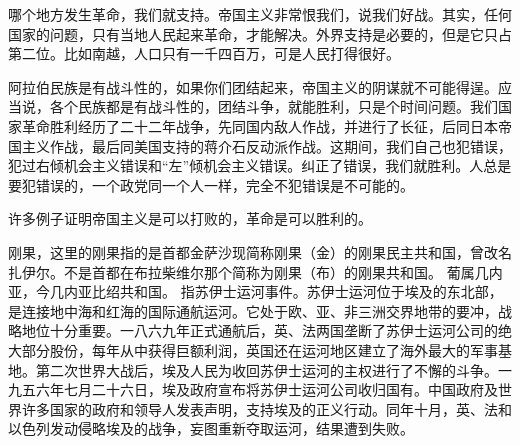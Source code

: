哪个地方发生革命，我们就支持。帝国主义非常恨我们，说我们好战。其实，任何国家的问题，只有当地人民起来革命，才能解决。外界支持是必要的，但是它只占第二位。比如南越，人口只有一千四百万，可是人民打得很好。

阿拉伯民族是有战斗性的，如果你们团结起来，帝国主义的阴谋就不可能得逞。应当说，各个民族都是有战斗性的，团结斗争，就能胜利，只是个时间问题。我们国家革命胜利经历了二十二年战争，先同国内敌人作战，并进行了长征，后同日本帝国主义作战，最后同美国支持的蒋介石反动派作战。这期间，我们自己也犯错误，犯过右倾机会主义错误和“左”倾机会主义错误。纠正了错误，我们就胜利。人总是要犯错误的，一个政党同一个人一样，完全不犯错误是不可能的。

许多例子证明帝国主义是可以打败的，革命是可以胜利的。


\begin{maonote}
刚果，这里的刚果指的是首都金萨沙现简称刚果（金）的刚果民主共和国，曾改名扎伊尔。不是首都在布拉柴维尔那个简称为刚果（布）的刚果共和国。
葡属几内亚，今几内亚比绍共和国。
指苏伊士运河事件。苏伊士运河位于埃及的东北部，是连接地中海和红海的国际通航运河。它处于欧、亚、非三洲交界地带的要冲，战略地位十分重要。一八六九年正式通航后，英、法两国垄断了苏伊士运河公司的绝大部分股份，每年从中获得巨额利润，英国还在运河地区建立了海外最大的军事基地。第二次世界大战后，埃及人民为收回苏伊士运河的主权进行了不懈的斗争。一九五六年七月二十六日，埃及政府宣布将苏伊士运河公司收归国有。中国政府及世界许多国家的政府和领导人发表声明，支持埃及的正义行动。同年十月，英、法和以色列发动侵略埃及的战争，妄图重新夺取运河，结果遭到失败。
\end{maonote}

